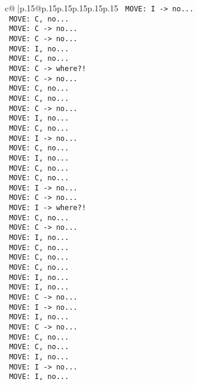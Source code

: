 \documentclass{article}
\begin{document}
{\begin{supertabular}{c@{$\;$}|p{.15\linewidth}@{}p{.15\linewidth}p{.15\linewidth}p{.15\linewidth}p{.15\linewidth}p{.15\linewidth}}
{{{\texttt{ MOVE: I {-}> no...} \\
\texttt{ MOVE: C, no...} \\
\texttt{ MOVE: C {-}> no...} \\
\texttt{ MOVE: C {-}> no...} \\
\texttt{ MOVE: I, no...} \\
\texttt{ MOVE: C, no...} \\
\texttt{ MOVE: C {-}> where?!} \\
\texttt{ MOVE: C {-}> no...} \\
\texttt{ MOVE: C, no...} \\
\texttt{ MOVE: C, no...} \\
\texttt{ MOVE: C {-}> no...} \\
\texttt{ MOVE: I, no...} \\
\texttt{ MOVE: C, no...} \\
\texttt{ MOVE: I {-}> no...} \\
\texttt{ MOVE: C, no...} \\
\texttt{ MOVE: I, no...} \\
\texttt{ MOVE: C, no...} \\
\texttt{ MOVE: C, no...} \\
\texttt{ MOVE: I {-}> no...} \\
\texttt{ MOVE: C {-}> no...} \\
\texttt{ MOVE: I {-}> where?!} \\
\texttt{ MOVE: C, no...} \\
\texttt{ MOVE: C {-}> no...} \\
\texttt{ MOVE: I, no...} \\
\texttt{ MOVE: C, no...} \\
\texttt{ MOVE: C, no...} \\
\texttt{ MOVE: C, no...} \\
\texttt{ MOVE: I, no...} \\
\texttt{ MOVE: I, no...} \\
\texttt{ MOVE: C {-}> no...} \\
\texttt{ MOVE: I {-}> no...} \\
\texttt{ MOVE: I, no...} \\
\texttt{ MOVE: C {-}> no...} \\
\texttt{ MOVE: C, no...} \\
\texttt{ MOVE: C, no...} \\
\texttt{ MOVE: I, no...} \\
\texttt{ MOVE: I {-}> no...} \\
\texttt{ MOVE: I, no...} \\
}}}
\end{supertabular}}
\end{document}
